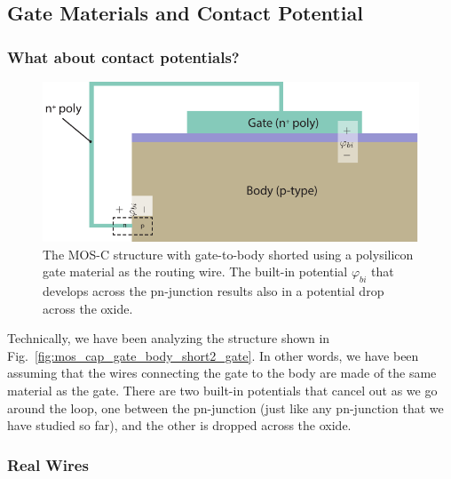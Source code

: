 \subsection{Gate Materials and Contact Potential}


\subsubsection{What about contact potentials?}

\begin{figure}[tbh]
\begin{center}
\includegraphics[width=.75\columnwidth]{mos_cap_short_phibi}
\end{center}
\caption{The MOS-C structure with gate-to-body shorted using a polysilicon gate material as the routing wire.  The built-in potential $\varphi_{bi}$ that develops across the pn-junction results also in a  potential drop across the oxide.} \label{fig:mos_cap_gate_body_short_gate}
\end{figure}

Technically, we have been analyzing the structure shown in Fig.~\ref{fig:mos_cap_gate_body_short2_gate}.  In other words, we have been assuming that the wires connecting the gate to the body are made of the same material as the gate.  There are two built-in potentials that cancel out as we go around the loop, one between the pn-junction (just like any pn-junction that we have studied so far), and the other is dropped across the oxide.  
 


\subsubsection{Real Wires}

